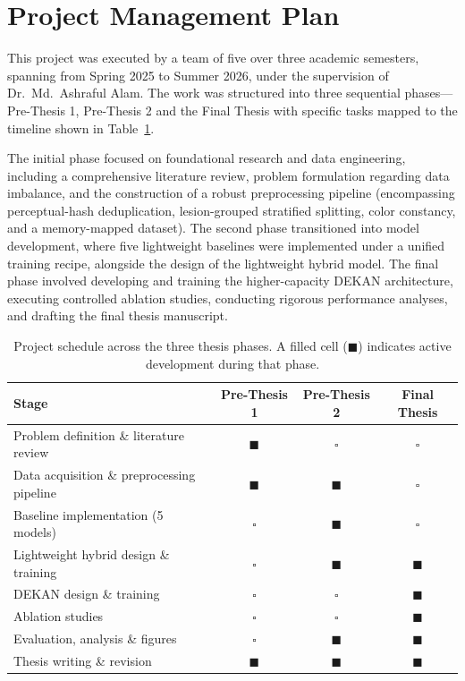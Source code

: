 \section{Project Management Plan}

This project was executed by a team of five over three academic semesters, spanning from Spring 2025 to Summer 2026, under the supervision of Dr.\ Md.\ Ashraful Alam. The work was structured into three sequential phases—Pre-Thesis 1, Pre-Thesis 2 and the Final Thesis with specific tasks mapped to the timeline shown in Table~\ref{tab:project-schedule}.

The initial phase focused on foundational research and data engineering, including a comprehensive literature review, problem formulation regarding data imbalance, and the construction of a robust preprocessing pipeline (encompassing perceptual-hash deduplication, lesion-grouped stratified splitting, color constancy, and a memory-mapped dataset). The second phase transitioned into model development, where five lightweight baselines were implemented under a unified training recipe, alongside the design of the lightweight hybrid model. The final phase involved developing and training the higher-capacity DEKAN architecture, executing controlled ablation studies, conducting rigorous performance analyses, and drafting the final thesis manuscript.

\begin{table}[H]
\centering
\caption{Project schedule across the three thesis phases. A filled cell ($\blacksquare$) indicates active development during that phase.}
\label{tab:project-schedule}
\small
\begin{tabularx}{\textwidth}{>{\raggedright\arraybackslash}Xccc}
\toprule
Stage & Pre-Thesis 1 & Pre-Thesis 2 & Final Thesis \\
\midrule
Problem definition \& literature review         & $\blacksquare$ & $\square$ & $\square$ \\
Data acquisition \& preprocessing pipeline      & $\blacksquare$ & $\blacksquare$ & $\square$ \\
Baseline implementation (5 models)              & $\square$ & $\blacksquare$ & $\square$ \\
Lightweight hybrid design \& training           & $\square$ & $\blacksquare$ & $\blacksquare$ \\
DEKAN design \& training                        & $\square$ & $\square$ & $\blacksquare$ \\
Ablation studies                                & $\square$ & $\square$ & $\blacksquare$ \\
Evaluation, analysis \& figures                 & $\square$ & $\blacksquare$ & $\blacksquare$ \\
Thesis writing \& revision                      & $\blacksquare$ & $\blacksquare$ & $\blacksquare$ \\
\bottomrule
\end{tabularx}
\end{table}

